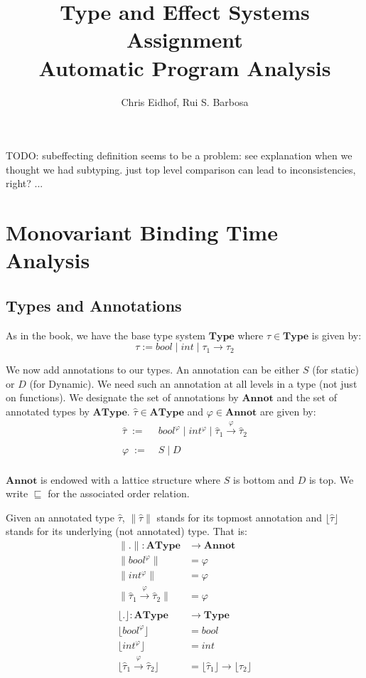 \documentclass[a4wide,12pt]{article}
\theoremstyle{definition}
\theoremstyle{plain}
\theoremstyle{remark}
\def\Type {\mathbf{Type}}
\def\AType{\mathbf{AType}}
\def\Annot{\mathbf{Annot}}
\def\sqleq{\sqsubseteq}
\def\htau{\hat{\tau}}
\def\annot#1{\|#1\|}
\def\baset#1{\lfloor#1\rfloor}
\begin{document}
\author{Chris Eidhof, Rui S. Barbosa}
\title{Type and Effect Systems Assignment \\ Automatic Program Analysis}
 
\maketitle


TODO: subeffecting definition seems to be a problem: see explanation when we thought we had subtyping.
   just top level comparison can lead to inconsistencies, right? ...

\section{Monovariant Binding Time Analysis}

\subsection{Types and Annotations}
As in the book, we have the base type system $\Type$ where $\tau \in \Type$ is given by:
\[\tau := bool\; |\; int\; | \;\tau_1 \to \tau_2\]

We  now add annotations to our types. An annotation can be either $S$ (for static) or $D$ (for Dynamic). 
We need such an annotation
at all levels in a type (not just on functions). We designate the set of annotations by $\Annot$ and
the set of annotated types by
$\AType$. $\htau \in \AType$ and $\varphi \in \Annot$ are given by:
\begin{align*}
\htau  \; := \; & bool^\varphi \mid int^\varphi \mid \htau_1 \overset{\varphi}{\to} \htau_2 \\
& \\
\varphi \; := \; & S \mid D\\
\end{align*}

$\Annot$ is endowed with a lattice structure where $S$ is bottom and  $D$ is top. We write $\sqleq$ for
the associated order relation. 

Given an annotated type $\htau$, $\annot{\htau}$ stands for its topmost annotation
and $\baset{\htau}$ stands for its underlying (not annotated) type. That is:
\begin{align*}
 \annot{.} : \AType &\to \Annot\\
 \annot{bool^\varphi} & = \varphi \\
 \annot{int^\varphi} & = \varphi \\
 \annot{\htau_1 \overset{\varphi}{\to} \htau_2} & = \varphi \\
\\
\baset{.}  : \AType &\to \Type\\
\baset{bool^\varphi} & = bool \\
\baset{int^\varphi} & = int \\
\baset{\htau_1 \overset{\varphi}{\to} \htau_2} & = \baset{\htau_1} \to \baset{\htau_2} \\
\end{align*}
\end{document}
